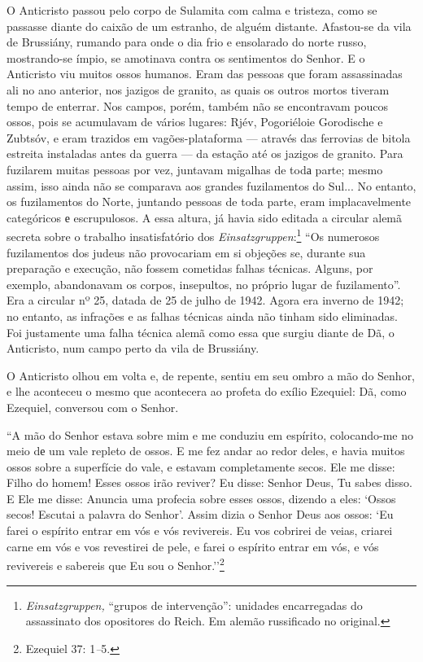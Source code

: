 O Anticristo passou pelo corpo de Sulamita com calma e tristeza, como se
passasse diante do caixão de um estranho, de alguém distante. Afastou-se
da vila de Brussiány, rumando para onde o dia frio e ensolarado do norte
russo, mostrando-se ímpio, se amotinava contra os sentimentos do Senhor.
E o Anticristo viu muitos ossos humanos. Eram das pessoas que foram
assassinadas ali no ano anterior, nos jazigos de granito, as quais os
outros mortos tiveram tempo de enterrar. Nos campos, porém, também não
se encontravam poucos ossos, pois se acumulavam de vários lugares: Rjév,
Pogoriéloie Gorodische e Zubtsóv, e eram trazidos em vagões-plataforma
--- através das ferrovias de bitola estreita instaladas antes da guerra
--- da estação até os jazigos de granito. Para fuzilarem muitas pessoas
por vez, juntavam migalhas de todа parte; mesmo assim, isso ainda não se
comparava aos grandes fuzilamentos do Sul... No entanto, os fuzilamentos
do Norte, juntando pessoas de toda parte, eram implacavelmente
categóricos е escrupulosos. A essa altura, já havia sido editada a
circular alemã secreta sobre o trabalho insatisfatório dos
\emph{Einsatzgruppen}:\footnote{\emph{Einsatzgruppen,} ``grupos de
  intervenção'': unidades encarregadas do assassinato dos opositores do
  Reich. Em alemão russificado no original.} ``Os numerosos fuzilamentos
dos judeus não provocariam em si objeções se, durante sua preparação e
execução, não fossem cometidas falhas técnicas. Alguns, por exemplo,
abandonavam os corpos, insepultos, no próprio lugar de fuzilamento''.
Era a circular nº 25, datada de 25 de julho de 1942. Agora era inverno
de 1942; no entanto, as infrações e as falhas técnicas ainda não tinham
sido eliminadas. Foi justamente uma falha técnica alemã como essa que
surgiu diante de Dã, o Anticristo, num campo perto da vila de Brussiány.

O Anticristo olhou em volta e, de repente, sentiu em seu ombro a mão do
Senhor, e lhe aconteceu o mesmo que acontecera ao profeta do exílio
Ezequiel: Dã, como Ezequiel, conversou com o Senhor.

``A mão do Senhor estava sobre mim e me conduziu em espírito,
colocando-me no meio dе um vale repleto de ossos. E me fez andar ao
redor deles, e havia muitos ossos sobre a superfície do vale, e estavam
completamente secos. Ele me disse: Filho do homem! Esses ossos irão
reviver? Eu disse: Senhor Deus, Tu sabes disso. E Ele me disse: Anuncia
uma profecia sobre esses ossos, dizendo a eles: `Ossos secos! Escutai a
palavra do Senhor'. Assim dizia o Senhor Deus aos ossos: `Eu farei o
espírito entrar em vós e vós revivereis. Eu vos cobrirei de veias,
criarei carne em vós e vos revestirei de pele, e farei o espírito entrar
em vós, e vós revivereis e sabereis que Eu sou o Senhor.''\footnote{Ezequiel
  37: 1\emph{--}5.}

